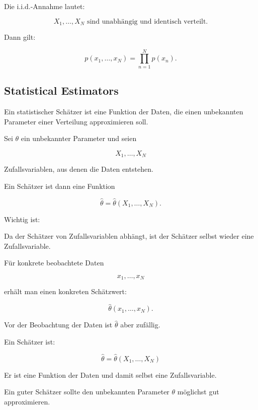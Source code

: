 \documentclass[11pt,a4paper]{scrartcl}
\begin{document}
\begin{answerbox}
    Die i.i.d.-Annahme lautet:

    \[
        \boxed{
            X_1,\dots,X_N
            \text{ sind unabhängig und identisch verteilt.}
        }
    \]

    Dann gilt:

    \[
        \boxed{
            p(x_1,\dots,x_N)
            =
            \prod_{n=1}^{N}p(x_n).
        }
    \]
\end{answerbox}

\subsection{Statistical Estimators}

\begin{notebox}
    Ein statistischer Schätzer ist eine Funktion der Daten, die einen unbekannten
    Parameter einer Verteilung approximieren soll.

    Sei \(\theta\) ein unbekannter Parameter und seien

    \[
        X_1,\dots,X_N
    \]

    Zufallsvariablen, aus denen die Daten entstehen.

    Ein Schätzer ist dann eine Funktion

    \[
        \hat\theta
        =
        \hat\theta(X_1,\dots,X_N).
    \]
\end{notebox}

\begin{solutionbox}
    Wichtig ist:

    Da der Schätzer von Zufallsvariablen abhängt, ist der Schätzer selbst wieder
    eine Zufallsvariable.

    Für konkrete beobachtete Daten

    \[
        x_1,\dots,x_N
    \]

    erhält man einen konkreten Schätzwert:

    \[
        \hat\theta(x_1,\dots,x_N).
    \]

    Vor der Beobachtung der Daten ist \(\hat\theta\) aber zufällig.
\end{solutionbox}

\begin{answerbox}
    Ein Schätzer ist:

    \[
        \boxed{
            \hat\theta
            =
            \hat\theta(X_1,\dots,X_N)
        }
    \]

    Er ist eine Funktion der Daten und damit selbst eine Zufallsvariable.

    Ein guter Schätzer sollte den unbekannten Parameter \(\theta\) möglichst gut
    approximieren.
\end{answerbox}
\end{document}
